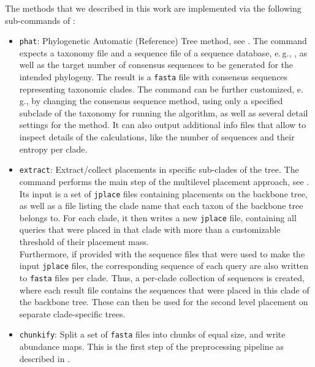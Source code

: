 The methods that we described in this work are implemented via the following sub-commands of :

\begin{itemize}
    \item \texttt{phat}: Phylogenetic Automatic (Reference) Tree method, see .
          The command expects a taxonomy file and a sequence file of a sequence database,
          e.\,g.,  \cite{Quast2013,Yilmaz2014},
          as well as the target number of consensus sequences to be generated for the intended phylogeny.
          The result is a \texttt{fasta} file with consensus sequences representing taxonomic clades.
          The command can be further customized, e.\,g., by changing the consensus sequence method,
          using only a specified subclade of the taxonomy for running the algorithm,
          as well as several detail settings for the method.
          It can also output additional info files that allow to inspect details of the calculations,
          like the number of sequences and their entropy per clade.
    \item \texttt{extract}: Extract/collect placements in specific sub-clades of the tree.
          The command performs the main step of the multilevel placement approach,
          see .
          Its input is a set of \texttt{jplace} files containing placements on the backbone tree,
          as well as a file listing the clade name that each taxon of the backbone tree belongs to.
          For each clade, it then writes a new \texttt{jplace} file,
          containing all queries that were placed in that clade with more than a customizable threshold
          of their placement mass.
          \\
          Furthermore, if provided with the sequence files that were used to make the input \texttt{jplace} files,
          the corresponding sequence of each query are also written to \texttt{fasta} files per clade.
          Thus, a per-clade collection of sequences is created, where each result file contains the sequences
          that were placed in this clade of the backbone tree.
          These can then be used for the second level placement on separate clade-specific trees.
    \item \texttt{chunkify}: Split a set of \texttt{fasta} files into chunks of equal size,
          and write abundance maps.
          This is the first step of the preprocessing pipeline as described in .

\end{itemize}
